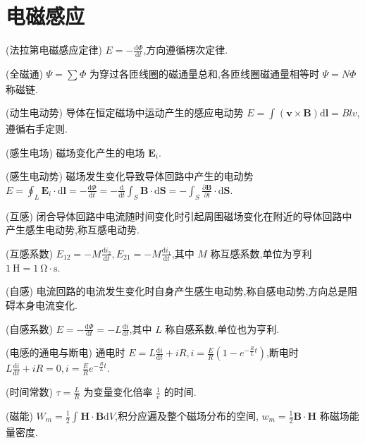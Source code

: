     \section{电磁感应}
    \begin{theorem}
        (法拉第电磁感应定律) $E=-\frac{\mathrm{d}\Phi}{\mathrm{d}t}$,方向遵循楞次定律.
    \end{theorem}
    \begin{definition}
        (全磁通) $\Psi=\sum_{}^{}\Phi$ 为穿过各匝线圈的磁通量总和,各匝线圈磁通量相等时 $\Psi=N\Phi$ 称磁链.
    \end{definition}
    \begin{definition}
        (动生电动势) 导体在恒定磁场中运动产生的感应电动势 $E=\int_{}^{}\left( \bm{v}\times \bm{B} \right) \mathrm{d}\bm{l}=Blv$,遵循右手定则.
    \end{definition}
    \begin{definition}
        (感生电场) 磁场变化产生的电场 $\bm{E}_{i}$.
    \end{definition}
    \begin{definition}
        (感生电动势) 磁场发生变化导致导体回路中产生的电动势 $E=\oint_{L}^{}\bm{E}_{i}\cdot \mathrm{d}\bm{l}=-\frac{\mathrm{d}\Phi}{\mathrm{d}t}=-\frac{\mathrm{d}}{\mathrm{d}t}\int_{S}^{}\bm{B}\cdot \mathrm{d}\bm{S}=-\int_{S}^{}\frac{\partial \bm{B}}{\partial t}\cdot \mathrm{d}\bm{S}$.
    \end{definition}
    \begin{definition}
        (互感) 闭合导体回路中电流随时间变化时引起周围磁场变化在附近的导体回路中产生感生电动势,称互感电动势.
    \end{definition}
    \begin{definition}
        (互感系数) $E_{12}=-M \frac{\mathrm{d}i_2}{\mathrm{d}t},E_{21}=-M \frac{\mathrm{d}i_1}{\mathrm{d}t}$,其中 $M$ 称互感系数,单位为亨利 $1\ \mathrm{H}=1 \ \mathrm{\Omega \cdot s}$.
    \end{definition}
    \begin{definition}
        (自感) 电流回路的电流发生变化时自身产生感生电动势,称自感电动势,方向总是阻碍本身电流变化.
    \end{definition}
    \begin{definition}
        (自感系数) $E=-\frac{\mathrm{d}\Phi}{\mathrm{d}t}=-L \frac{\mathrm{d}i}{\mathrm{d}t}$,其中 $L$ 称自感系数,单位也为亨利.
    \end{definition}
    \begin{theorem}
        (电感的通电与断电) 通电时 $E=L \frac{\mathrm{d}i}{\mathrm{d}t}+iR,i=\frac{E}{R}\left( 1-e^{-\frac{R}{L}t} \right) $,断电时 $L \frac{\mathrm{d}i}{\mathrm{d}t}+iR=0,i=\frac{E}{R}e^{-\frac{R}{L}t}$.
    \end{theorem}
    \begin{definition}
        (时间常数) $\tau=\frac{L}{R}$ 为变量变化倍率 $\frac{1}{e}$ 的时间.
    \end{definition}
    \begin{definition}
        (磁能) $W_{m}=\frac{1}{2}\int_{}^{}\bm{H}\cdot \bm{B}\mathrm{d}V$,积分应遍及整个磁场分布的空间, $w_{m}=\frac{1}{2}\bm{B}\cdot \bm{H}$ 称磁场能量密度.
    \end{definition}
